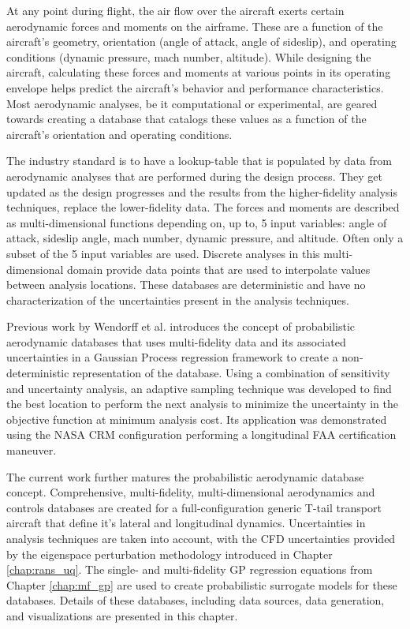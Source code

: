 At any point during flight, the air flow over the aircraft exerts certain aerodynamic forces and moments on the airframe.
These are a function of the aircraft's geometry, orientation (angle of attack, angle of sideslip), and operating conditions (dynamic pressure, mach number, altitude).
While designing the aircraft, calculating these forces and moments at various points in its operating envelope helps predict the aircraft's behavior and performance characteristics.
Most aerodynamic analyses, be it computational or experimental, are geared towards creating a database that catalogs these values as a function of the aircraft's orientation and operating conditions.

The industry standard is to have a lookup-table that is populated by data from aerodynamic analyses that are performed during the design process.
They get updated as the design progresses and the results from the higher-fidelity analysis techniques, replace the lower-fidelity data.
The forces and moments are described as multi-dimensional functions depending on, up to, 5 input variables: angle of attack, sideslip angle, mach number, dynamic pressure, and altitude.
Often only a subset of the 5 input variables are used.
Discrete analyses in this multi-dimensional domain provide data points that are used to interpolate values between analysis locations.
These databases are deterministic and have no characterization of the uncertainties present in the analysis techniques. 

Previous work by Wendorff et al. \cite{wendorff_combining_2016} introduces the concept of probabilistic aerodynamic databases that uses multi-fidelity data and its associated uncertainties in a Gaussian Process regression framework to create a non-deterministic representation of the database.
Using a combination of sensitivity and uncertainty analysis, an adaptive sampling technique was developed to find the best location to perform the next analysis to minimize the uncertainty in the objective function at minimum analysis cost.
Its application was demonstrated using the NASA CRM configuration performing a longitudinal FAA certification maneuver. 

The current work further matures the probabilistic aerodynamic database concept.
Comprehensive, multi-fidelity, multi-dimensional aerodynamics and controls databases are created for a full-configuration generic T-tail transport aircraft that define it's lateral and longitudinal dynamics.
Uncertainties in analysis techniques are taken into account, with the CFD uncertainties provided by the eigenspace perturbation methodology introduced in Chapter \ref{chap:rans_uq}.
The single- and multi-fidelity GP regression equations from Chapter \ref{chap:mf_gp} are used to create probabilistic surrogate models for these databases. 
Details of these databases, including data sources, data generation, and visualizations are presented in this chapter. 